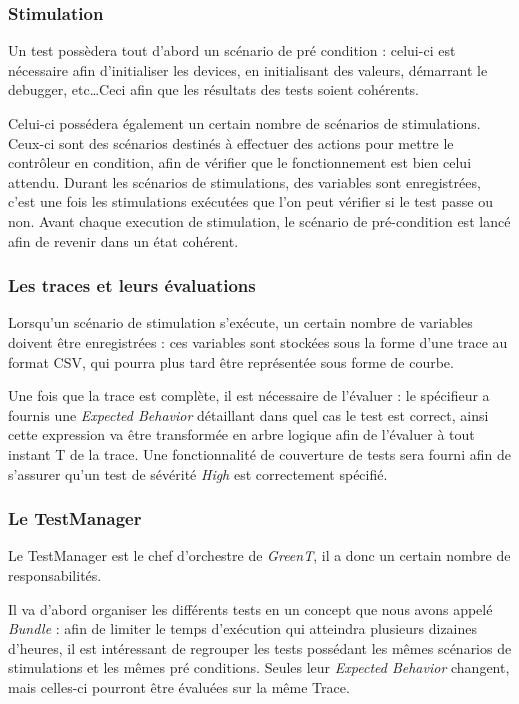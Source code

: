 	\subsubsection{Stimulation} \label{stim}
		Un test possèdera tout d'abord un scénario de pré condition : celui-ci est nécessaire afin d'initialiser les devices, en initialisant des valeurs, démarrant le debugger, etc\ldots Ceci afin que les résultats des tests soient cohérents.

		Celui-ci possédera également un certain nombre de scénarios de stimulations. Ceux-ci sont des scénarios destinés à effectuer des actions pour mettre le contrôleur en condition, afin de vérifier que le fonctionnement est bien celui attendu. Durant les scénarios de stimulations, des variables sont enregistrées, c'est une fois les stimulations exécutées que l'on peut vérifier si le test passe ou non. Avant chaque execution de stimulation, le scénario de pré-condition est lancé afin de revenir dans un état cohérent.

	\subsubsection{Les traces et leurs évaluations}\label{expectedBehavior}
	Lorsqu'un scénario de stimulation s'exécute, un certain nombre de variables doivent être enregistrées : ces variables sont stockées sous la forme d'une trace au format CSV, qui pourra plus tard être représentée sous forme de courbe. 

	Une fois que la trace est complète, il est nécessaire de l'évaluer : le spécifieur a fournis une \textit{Expected Behavior} détaillant dans quel cas le test est correct, ainsi cette expression va être transformée en arbre logique afin de l'évaluer à tout instant T de la trace. Une fonctionnalité de couverture de tests sera fourni afin de s'assurer qu'un test de sévérité \textit{High} est correctement spécifié.

	\subsubsection{Le TestManager}\label{testManager}
	Le TestManager est le chef d'orchestre de \textit{GreenT}, il a donc un certain nombre de responsabilités. 

	Il va d'abord organiser les différents tests en un concept que nous avons appelé \textit{Bundle} : afin de limiter le temps d'exécution qui atteindra plusieurs dizaines d'heures, il est intéressant de regrouper les tests possédant les mêmes scénarios de stimulations et les mêmes pré conditions. Seules leur \textit{Expected Behavior} changent, mais celles-ci pourront être évaluées sur la même Trace.

